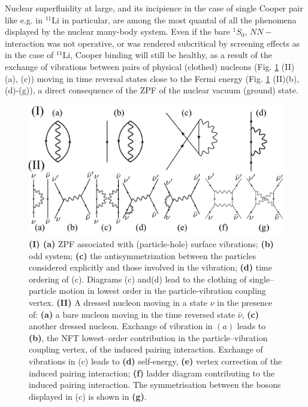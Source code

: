 \begin{subappendices}
Nuclear superfluidity at large, and its incipience in the case of single Cooper pair like e.g. in $^{11}$Li in particular, are among the most quantal of all  the phenomena displayed by the nuclear many-body 
system. Even if the bare $^1S_0$, $NN-$interaction was not operative, or was rendered subcritical by screening effects as in the case of $^{11}$Li, Cooper binding will still be healthy, as a result of the exchange of vibrations between pairs of physical (clothed) nucleons (Fig. \ref{fig6G1} (II) (a), (c)) moving in time reversal states close to the Fermi energy (Fig. \ref{fig6G1} (II)(b),(d)-(g)), a direct
consequence of the ZPF of the  nuclear vacuum (ground) state.
\begin{figure}
\centerline{\includegraphics[width=\textwidth]{C8/figsC8/fig6G1.pdf}}
\caption{{\bf (I) (a)} ZPF associated with (particle-hole) surface vibrations; 
{\bf (b)} odd system; {\bf (c)} the antisymmetrization between the particles  considered explicitly and 
those involved in the vibration; {\bf (d)} time ordering of (c). 
Diagrams (c) and(d) lead to the clothing of single--particle motion  in lowest order in the 
particle-vibration coupling vertex.
{\bf (II)} A dressed  nucleon moving in a state $\nu$ in the presence of: {\bf (a)} a bare nucleon
moving in the time reversed state $\bar \nu$,
{\bf (c)} another dressed nucleon. Exchange of vibration in $(a)$ leads to {\bf (b)}, the NFT 
lowest--order contribution in the particle--vibration coupling vertex, of the induced pairing interaction. Exchange 
of vibrations in {(c)}  leads to  {\bf (d)} self-energy, {\bf (e)} vertex correction of the  
induced pairing interaction;  {\bf (f)} ladder diagram contributing to the induced pairing interaction.
The symmetrisation between the bosons displayed in (c) is shown in {\bf (g)}.}\label{fig6G1}
\end{figure}


\end{subappendices}
